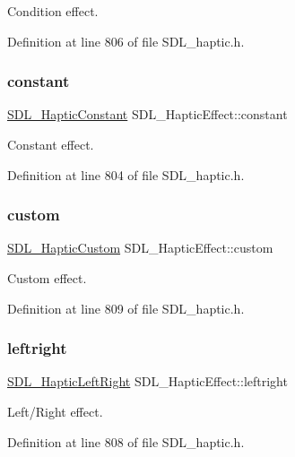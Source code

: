 Condition effect. 

Definition at line 806 of file S\+D\+L\+\_\+haptic.\+h.

\mbox{\label{union_s_d_l___haptic_effect_ac435275e9683d6cc5d65b9c7cc2ec659}} 
\subsubsection{\texorpdfstring{constant}{constant}}
{\footnotesize\ttfamily \mbox{\hyperlink{struct_s_d_l___haptic_constant}{S\+D\+L\+\_\+\+Haptic\+Constant}} S\+D\+L\+\_\+\+Haptic\+Effect\+::constant}

Constant effect. 

Definition at line 804 of file S\+D\+L\+\_\+haptic.\+h.

\mbox{\label{union_s_d_l___haptic_effect_a0b2d2af28c515cc39896b2b7c23019d2}} 
\subsubsection{\texorpdfstring{custom}{custom}}
{\footnotesize\ttfamily \mbox{\hyperlink{struct_s_d_l___haptic_custom}{S\+D\+L\+\_\+\+Haptic\+Custom}} S\+D\+L\+\_\+\+Haptic\+Effect\+::custom}

Custom effect. 

Definition at line 809 of file S\+D\+L\+\_\+haptic.\+h.

\mbox{\label{union_s_d_l___haptic_effect_a3c254b81c1ff41c7888eee0cd0076a12}} 
\subsubsection{\texorpdfstring{leftright}{leftright}}
{\footnotesize\ttfamily \mbox{\hyperlink{struct_s_d_l___haptic_left_right}{S\+D\+L\+\_\+\+Haptic\+Left\+Right}} S\+D\+L\+\_\+\+Haptic\+Effect\+::leftright}

Left/\+Right effect. 

Definition at line 808 of file S\+D\+L\+\_\+haptic.\+h.

